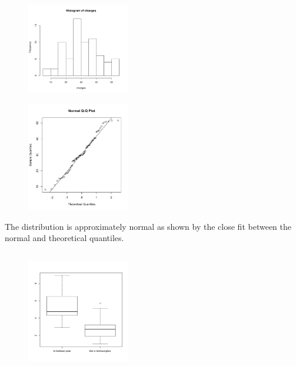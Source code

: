 \documentclass[twocolumn]{article}
\begin{document}
\subsection{}
\begin{figure}[!ht]
\centering
\includegraphics[width=0.4\textwidth]{6b1.pdf}
\end{figure}
\begin{figure}[!ht]
\centering
\includegraphics[width=0.4\textwidth]{6b2.pdf}
\end{figure}

The distribution is approximately normal as shown by the close fit between the normal and theoretical quantiles.

\subsection{}
\begin{figure}[h]
\centering
\includegraphics[width=0.4\textwidth]{6c.pdf}
\end{figure}
\end{document}
